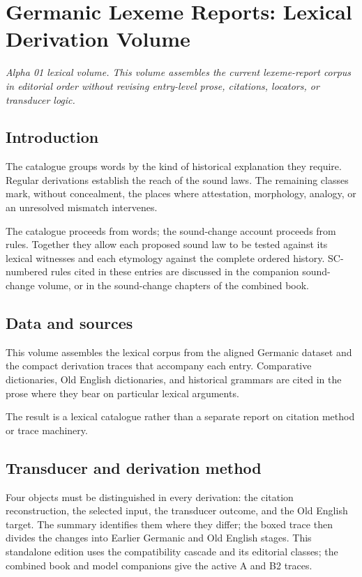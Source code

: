 \documentclass[
  british,
  a4paper,
]{article}
\author{}
\date{}
\begin{document}
\section{Germanic Lexeme Reports: Lexical Derivation
Volume}\label{germanic-lexeme-reports-lexical-derivation-volume}

\emph{Alpha 01 lexical volume. This volume assembles the current
lexeme-report corpus in editorial order without revising entry-level
prose, citations, locators, or transducer logic.}

\subsection{Introduction}\label{introduction}

The catalogue groups words by the kind of historical explanation they
require. Regular derivations establish the reach of the sound laws. The
remaining classes mark, without concealment, the places where
attestation, morphology, analogy, or an unresolved mismatch intervenes.

The catalogue proceeds from words; the sound-change account proceeds
from rules. Together they allow each proposed sound law to be tested
against its lexical witnesses and each etymology against the complete
ordered history. SC-numbered rules cited in these entries are discussed
in the companion sound-change volume, or in the sound-change chapters of
the combined book.

\subsection{Data and sources}\label{data-and-sources}

This volume assembles the lexical corpus from the aligned Germanic
dataset and the compact derivation traces that accompany each entry.
Comparative dictionaries, Old English dictionaries, and historical
grammars are cited in the prose where they bear on particular lexical
arguments.

The result is a lexical catalogue rather than a separate report on
citation method or trace machinery.

\subsection{Transducer and derivation
method}\label{transducer-and-derivation-method}

Four objects must be distinguished in every derivation: the citation
reconstruction, the selected input, the transducer outcome, and the Old
English target. The summary identifies them where they differ; the boxed
trace then divides the changes into Earlier Germanic and Old English
stages. This standalone edition uses the compatibility cascade and its
editorial classes; the combined book and model companions give the
active A and B2 traces.
\end{document}
